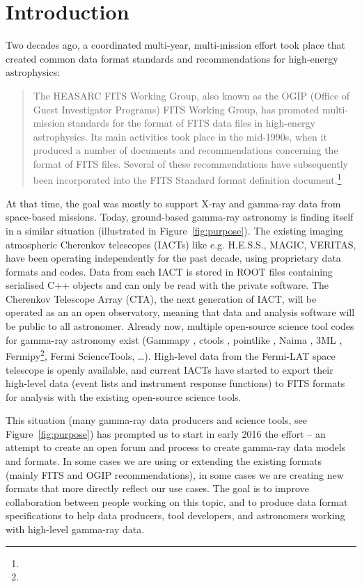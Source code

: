\section{Introduction}

Two decades ago, a coordinated multi-year, multi-mission effort took place that created common data format standards and recommendations for high-energy astrophysics:

\begin{quotation}
The HEASARC FITS Working Group, also known as the OGIP (Office of Guest Investigator Programs) FITS Working Group, has promoted multi-mission standards for the format of FITS data files in high-energy astrophysics. Its main activities took place in the mid-1990s, when it produced a number of documents and recommendations concerning the format of FITS files. Several of these recommendations have subsequently been incorporated into the FITS Standard format definition document.\footnote{\ogip}
\end{quotation}

At that time, the goal was mostly to support X-ray and gamma-ray data from space-based missions. Today, ground-based gamma-ray astronomy is finding itself in a similar situation (illustrated in Figure~\ref{fig:purpose}). The existing imaging atmospheric Cherenkov telescopes (IACTs) like e.g. H.E.S.S., MAGIC, VERITAS, have been operating independently for the past decade, using proprietary data formats and codes. Data from each IACT is stored in ROOT files containing serialised C++ objects and can only be read with the private software. The Cherenkov Telescope Array (CTA), the next generation of IACT, will be operated as an an open observatory, meaning that data and analysis software will be public to all astronomer. Already now, multiple open-source science tool codes for gamma-ray astronomy exist (Gammapy \cite{2015arXiv150907408D}, ctools \cite{2016AnA...593A...1K}, pointlike \citep{2010PhDT.......147K}, Naima \citep{2015arXiv150903319Z}, 3ML \citep{2015arXiv150708343V}, Fermipy\footnote{\fermipy}, Fermi ScienceTools, \ldots). High-level data from the Fermi-LAT space telescope is openly available, and current IACTs have started to export their high-level data (event lists and instrument response functions) to FITS formats for analysis with the existing open-source science tools.

This situation (many gamma-ray data producers and science tools, see Figure~\ref{fig:purpose}) has prompted us to start in early 2016 the \gadf effort -- an attempt to create an open forum and process to create gamma-ray data models and formats. In some cases we are using or extending the existing formats (mainly FITS and OGIP recommendations), in some cases we are creating new formats that more directly reflect our use cases. The goal is to improve collaboration between people working on this topic, and to produce data format specifications to help data producers, tool developers, and astronomers working with high-level gamma-ray data.

